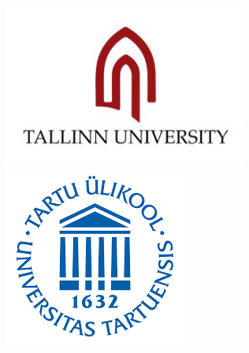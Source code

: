 \begin{figure}[ht]
\begin{minipage}[b]{0.06\linewidth}
        \end{minipage}
        \hfill
        \begin{minipage}[b]{0.06\linewidth}
            \includegraphics[width=\linewidth]{images/tu.jpg}
        \end{minipage}
        \hfill
        \begin{minipage}[b]{0.06\linewidth}
            \includegraphics[width=\linewidth]{images/tartu.png}
        \end{minipage}
        \hfill
        \begin{minipage}[b]{0.06\linewidth}

\end{minipage}
\end{figure}
